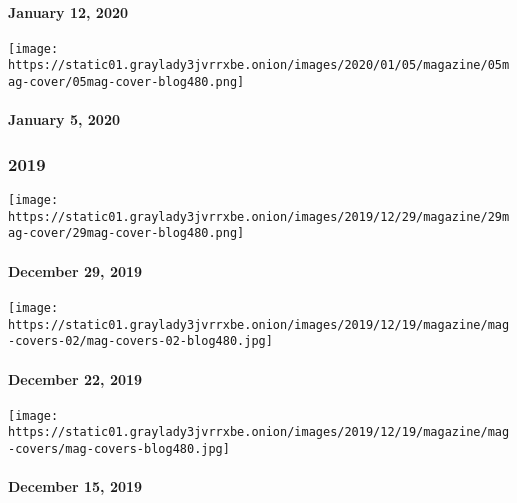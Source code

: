 \hypertarget{january-12-2020}{%
\paragraph{January 12, 2020}\label{january-12-2020}}

\href{https://www.nytimes3xbfgragh.onion/issue/magazine/2020/01/02/the-1520-issue}{}

\texttt{[image: https://static01.graylady3jvrrxbe.onion/images/2020/01/05/magazine/05mag-cover/05mag-cover-blog480.png]}

\hypertarget{january-5-2020}{%
\paragraph{January 5, 2020}\label{january-5-2020}}

\hypertarget{2019}{%
\subsubsection{2019}\label{2019}}

\href{https://www.nytimes3xbfgragh.onion/issue/magazine/2019/12/24/the-122919-issue}{}

\texttt{[image: https://static01.graylady3jvrrxbe.onion/images/2019/12/29/magazine/29mag-cover/29mag-cover-blog480.png]}

\hypertarget{december-29-2019}{%
\paragraph{December 29, 2019}\label{december-29-2019}}

\href{https://www.nytimes3xbfgragh.onion/issue/magazine/2019/12/19/the-122219-issue}{}

\texttt{[image: https://static01.graylady3jvrrxbe.onion/images/2019/12/19/magazine/mag-covers-02/mag-covers-02-blog480.jpg]}

\hypertarget{december-22-2019}{%
\paragraph{December 22, 2019}\label{december-22-2019}}

\href{https://www.nytimes3xbfgragh.onion/issue/magazine/2019/12/19/the-121519-issue}{}

\texttt{[image: https://static01.graylady3jvrrxbe.onion/images/2019/12/19/magazine/mag-covers/mag-covers-blog480.jpg]}

\hypertarget{december-15-2019}{%
\paragraph{December 15, 2019}\label{december-15-2019}}

